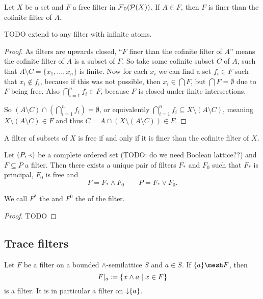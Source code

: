 \begin{proposition}
Let $X$ be a set and $F$ a free filter in $\operatorname{\mathcal{F}}_0(\operatorname{\mathcal{P}}(X))$. If $A\in F$, then $F$ is finer than the cofinite filter of $A$.
\end{proposition}
TODO extend to any filter with infinite atoms.
\begin{proof}
As filters are upwards closed, ``$F$ finer than the cofinite filter of $A$'' means the cofinite filter of $A$ is a subset of $F$. So take some cofinite subset $C$ of $A$, such that $A\setminus C = \{x_1, \ldots, x_n\}$ is finite. Now for each $x_i$ we can find a set $f_i\in F$ such that $x_i\notin f_i$, because if this was not possible, then $x_i \in \bigcap F$, but $\bigcap F = \emptyset$ due to $F$ being free. Also $\bigcap_{i=1}^n f_i \in F$, because $F$ is closed under finite intersections.

So $(A\setminus C)\cap (\bigcap_{i=1}^n f_i) = \emptyset$, or equivalently $\bigcap_{i=1}^n f_i \subseteq X\setminus (A\setminus C)$, meaning $X\setminus (A\setminus C) \in F$ and thus $C = A\cap (X\setminus (A\setminus C)) \in F$.
\end{proof}
\begin{corollary} \label{filterFreeIFFfinerThanCofinite}
A filter of subsets of $X$ is free \textup{if and only if} it is finer than the cofinite filter of $X$.
\end{corollary}

\begin{proposition}
Let $\left( P,\Yleft \right)$ be a complete ordered set (TODO: do we need Boolean lattice??) and $F\subseteq P$ a filter. Then there exists a unique pair of filters $F_*$ and $F_0$ such that $F_*$ is principal, $F_0$ is free and
\[ F = F_* \wedge F_0 \qquad P = F_* \vee F_0. \]
\end{proposition}
We call $F^*$ the  and $F^0$ the  of the filter.
\begin{proof}
TODO
\end{proof}

\subsection{Trace filters}
\begin{lemma} \label{traceFilter}
Let $F$ be a filter on a bounded $\wedge$-semilattice $S$ and $a\in S$. If $\{a\}\mesh F$, then
\[ F|_a \coloneqq \left\{ x\wedge a \;\middle|\; x\in F \right\} \]
is a filter. It is in particular a filter on $\operatorname{\downarrow} \{a\}$.
\end{lemma}


